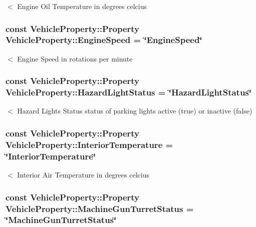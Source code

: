 $<$ Engine Oil Temperature in degrees celcius \hypertarget{classVehicleProperty_a7949fe3d031814fc2644de14f8cec9a0}{
\subsubsection[{Engine\-Speed}]{\setlength{\rightskip}{0pt plus 5cm}const Vehicle\-Property\-::\-Property Vehicle\-Property\-::\-Engine\-Speed = \char`\"{}Engine\-Speed\char`\"{}\hspace{0.3cm}{\ttfamily [static]}}}\label{classVehicleProperty_a7949fe3d031814fc2644de14f8cec9a0}
$<$ Engine Speed in rotations per minute \hypertarget{classVehicleProperty_a21058071101327c72251e2e09e24cb67}{
\subsubsection[{Hazard\-Light\-Status}]{\setlength{\rightskip}{0pt plus 5cm}const Vehicle\-Property\-::\-Property Vehicle\-Property\-::\-Hazard\-Light\-Status = \char`\"{}Hazard\-Light\-Status\char`\"{}\hspace{0.3cm}{\ttfamily [static]}}}\label{classVehicleProperty_a21058071101327c72251e2e09e24cb67}
$<$ Hazard Lights Status status of parking lights active (true) or inactive (false) \hypertarget{classVehicleProperty_adbbb68033f8531903ff3e3024864eef3}{
\subsubsection[{Interior\-Temperature}]{\setlength{\rightskip}{0pt plus 5cm}const Vehicle\-Property\-::\-Property Vehicle\-Property\-::\-Interior\-Temperature = \char`\"{}Interior\-Temperature\char`\"{}\hspace{0.3cm}{\ttfamily [static]}}}\label{classVehicleProperty_adbbb68033f8531903ff3e3024864eef3}
$<$ Interior Air Temperature in degrees celcius \hypertarget{classVehicleProperty_a8b9faaa1094c2d162ed171a3063b7ffc}{
\subsubsection[{Machine\-Gun\-Turret\-Status}]{\setlength{\rightskip}{0pt plus 5cm}const Vehicle\-Property\-::\-Property Vehicle\-Property\-::\-Machine\-Gun\-Turret\-Status = \char`\"{}Machine\-Gun\-Turret\-Status\char`\"{}\hspace{0.3cm}{\ttfamily [static]}}}\label{classVehicleProperty_a8b9faaa1094c2d162ed171a3063b7ffc}
